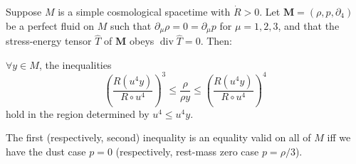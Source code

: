 Suppose $M$ is a simple cosmological spacetime with $\dot{R} > 0$. Let $\mathbf{M} = (\rho, p, \partial_4)$ be a perfect fluid on $M$ such that $\partial_\mu \rho = 0 = \partial_\mu p$ for $\mu = 1, 2, 3$, and that the stress-energy tensor $\hat{T}$ of $\mathbf{M}$ obeys $\operatorname{div} \hat{T} = 0$. Then:

 $\forall y \in M$, the inequalities
$$
\left( \frac{R(u^4 y)}{R \circ u^4} \right)^3 \leq \frac{\rho}{\rho y} \leq \left( \frac{R(u^4 y)}{R \circ u^4} \right)^4
$$
hold in the region determined by $u^4 \leq u^4 y$.

 The first (respectively, second) inequality is an equality valid on all of $M$ iff we have the dust case $p = 0$ (respectively, rest-mass zero case $p = \rho/3$).
